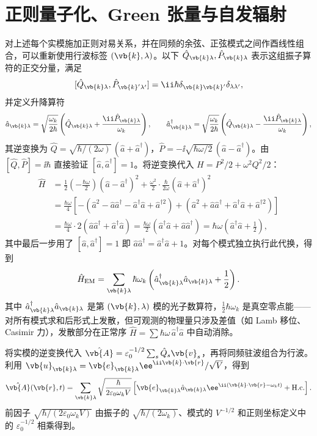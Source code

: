 \section{正则量子化、Green 张量与自发辐射}
对上述每个实模施加正则对易关系，并在同频的余弦、正弦模式之间作酉线性组合，可以重新使用行波标签 $(\vb{k},\lambda)$。以下 $\hat Q_{\vb{k}\lambda},\hat P_{\vb{k}\lambda}$ 表示这组振子算符的正交分量，满足
\[
[\hat Q_{\vb{k}\lambda},\hat P_{\vb{k}'\lambda'}]
=\ii\hbar\delta_{\vb{k}\vb{k}'}\delta_{\lambda\lambda'},
\]
并定义升降算符
\begin{equation}
\hat a_{\vb{k}\lambda}
=\sqrt{\frac{\omega_k}{2\hbar}}\left(\hat Q_{\vb{k}\lambda}
+\frac{\ii\hat P_{\vb{k}\lambda}}{\omega_k}\right),
\qquad
\hat a_{\vb{k}\lambda}^\dagger
=\sqrt{\frac{\omega_k}{2\hbar}}\left(\hat Q_{\vb{k}\lambda}
-\frac{\ii\hat P_{\vb{k}\lambda}}{\omega_k}\right),
\label{eq:ladder-operator-definition}
\end{equation}
其逆变换为 $\hat Q=\sqrt{\hbar/(2\omega)}\,(\hat a+\hat a^\dagger)$，$\hat P=-\ii\sqrt{\hbar\omega/2}\,(\hat a-\hat a^\dagger)$。由 $[\hat Q,\hat P]=\ii\hbar$ 直接验证 $[\hat a,\hat a^\dagger]=1$。将逆变换代入 $H=P^2/2+\omega^2 Q^2/2$：
\begin{align*}
\hat H
&=\frac12\left(-\frac{\hbar\omega}{2}\right)(\hat a-\hat a^\dagger)^2
+\frac{\omega^2}{2}\cdot\frac{\hbar}{2\omega}(\hat a+\hat a^\dagger)^2\\
&=\frac{\hbar\omega}{4}\left[-(\hat a^2-\hat a\hat a^\dagger-\hat a^\dagger\hat a+\hat a^{\dagger2})
+(\hat a^2+\hat a\hat a^\dagger+\hat a^\dagger\hat a+\hat a^{\dagger2})\right]\\
&=\frac{\hbar\omega}{4}\cdot 2(\hat a\hat a^\dagger+\hat a^\dagger\hat a)
=\frac{\hbar\omega}{2}(\hat a^\dagger\hat a+\hat a\hat a^\dagger)
=\hbar\omega\left(\hat a^\dagger\hat a+\frac12\right),
\end{align*}
其中最后一步用了 $[\hat a,\hat a^\dagger]=1$ 即 $\hat a\hat a^\dagger=\hat a^\dagger\hat a+1$。对每个模式独立执行此代换，得到
\[
\hat H_{\rm EM}
=\sum_{\vb{k}\lambda}
\hbar\omega_k
\left(
\hat a_{\vb{k}\lambda}^\dagger
\hat a_{\vb{k}\lambda}+\frac12
\right).
\]
其中 $\hat a_{\vb{k}\lambda}^\dagger\hat a_{\vb{k}\lambda}$ 是第 $(\vb{k},\lambda)$ 模的光子数算符，$\frac12\hbar\omega_k$ 是真空零点能——对所有模式求和后形式上发散，但可观测的物理量只涉及差值（如 Lamb 移位、Casimir 力），发散部分在正常序 $\hat H=\sum\hbar\omega\,\hat a^\dagger\hat a$ 中自动消除。

将实模的逆变换代入 $\hat{\vb{A}}=\varepsilon_0^{-1/2}\sum_s\hat Q_s\vb{v}_s$，再将同频驻波组合为行波。利用 $\vb{u}_{\vb{k}\lambda}=\vb{e}_{\vb{k}\lambda}\ee^{\ii\vb{k}\cdot\vb{r}}/\sqrt V$，得到
\[
\hat{\vb{A}}(\vb{r},t)
=\sum_{\vb{k}\lambda}
\sqrt{\frac{\hbar}{2\varepsilon_0\omega_kV}}
\left[
\vb{e}_{\vb{k}\lambda}
\hat a_{\vb{k}\lambda}
 \ee^{\ii(\vb{k}\cdot\vb{r}-\omega_kt)}
+\text{H.c.}
\right].
\]
前因子 $\sqrt{\hbar/(2\varepsilon_0\omega_kV)}$ 由振子的 $\sqrt{\hbar/(2\omega_k)}$、模式的 $V^{-1/2}$ 和正则坐标定义中的 $\varepsilon_0^{-1/2}$ 相乘得到。

